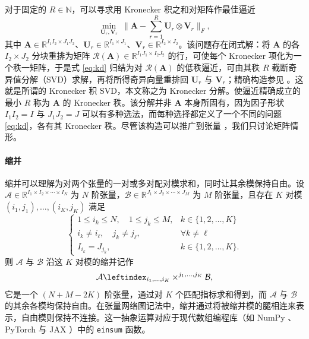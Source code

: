 \documentclass[11pt]{article}
\newcommand{\R}{\mathbb{R}}
\newcommand{\ten}[1]{\mathcal{#1}}
\newcommand{\mat}[1]{\mathbf{#1}}
\begin{document}
对于固定的 $R \in \mathbb{N}$，可以寻求用 Kronecker 积之和对矩阵作最佳逼近
\begin{equation}
\label{eq:kd}
\min_{\mat{U}_r,\mat{V}_r}\ \| \mat{A}-\sum_{r=1}^{R}\mat{U}_r\otimes\mat{V}_r\|_F,
\end{equation}
其中 $\mat{A}\in\R^{I_1I_2\times J_1J_2}$、$\mat{U}_r\in\R^{I_1\times J_1}$、$\mat{V}_r\in\R^{I_2\times J_2}$。该问题存在闭式解：将 $\mat{A}$ 的各 $I_2\times J_2$ 分块重排为矩阵 $\mathcal{R}(\mat{A})\in\R^{I_1J_1\times I_2J_2}$ 的行，可使每个 Kronecker 项化为一个秩一矩阵，于是式 \eqref{eq:kd} 归结为对 $\mathcal{R}(\mat{A})$ 的低秩逼近，可由其秩 $R$ 截断奇异值分解（SVD）求解，再将所得奇异向量重排回 $\mat{U}_r$ 与 $\mat{V}_r$；精确构造参见 \cite{golubvanloan}。这就是所谓的 Kronecker 积 SVD，本文称之为 Kronecker 分解。使逼近精确成立的最小 $R$ 称为 $\mat{A}$ 的 Kronecker 秩。该分解并非 $\mat{A}$ 本身所固有，因为因子形状 $I_1I_2=I$ 与 $J_1J_2=J$ 可以有多种选法，而每种选择都定义了一个不同的问题 \eqref{eq:kd}，各有其 Kronecker 秩。尽管该构造可以推广到张量 \cite{batselier2017ktd}，我们只讨论矩阵情形。


\paragraph{缩并} 缩并可以理解为对两个张量的一对或多对配对模求和，同时让其余模保持自由。设 $\ten{A}\in\R^{I_1\times I_2\times \cdots\times I_N}$ 为 $N$ 阶张量，$\ten{B}\in\R^{J_1\times J_2 \times \cdots\times J_M}$ 为 $M$ 阶张量，且存在 $K$ 对模 $(i_1,j_1),\ldots,(i_K,j_K)$ 满足
\begin{equation}
\left\{
\begin{array}{ll}
  1\le i_k\le N, \quad 1\le j_k\le M,  &  k\in\{1,2,\ldots,K\} \\
  i_k \neq i_\ell, \quad  j_k\neq j_\ell, &  \forall k \neq \ell \\
  I_{i_k}=J_{j_k}, & k\in \{1,2,\ldots,K\}.
\end{array}
\right.
\end{equation}
则 $\ten{A}$ 与 $\ten{B}$ 沿这 $K$ 对模的缩并记作
\begin{equation}
    \ten{A}\leftindex_{i_1,\ldots,i_K}\times^{j_1,\ldots,j_K}\ten{B},
\end{equation}
它是一个 $(N+M-2K)$ 阶张量，通过对 $K$ 个匹配指标求和得到，而 $\ten{A}$ 与 $\ten{B}$ 的其余各模均保持自由。在张量网络图记法中，缩并通过将被缩并模的腿相连来表示，自由模则保持不连接。这一抽象运算对应于现代数组编程库（如 NumPy \cite{harris2020numpy}、PyTorch \cite{paszke2019pytorch} 与 JAX \cite{bradbury2018jax}）中的 \texttt{einsum} 函数。
\end{document}
